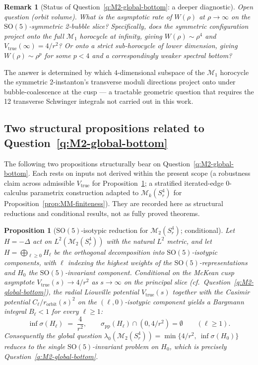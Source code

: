\documentclass[11pt,letterpaper]{article}
\newtheorem{proposition}[theorem]{Proposition}
\theoremstyle{definition}
\newtheorem{remark}[theorem]{Remark}
\newcommand{\cM}{\mathcal{M}}
\newcommand{\Lap}{\Delta}
\begin{document}
\begin{remark}[Status of Question~\ref{q:M2-global-bottom}: a deeper diagnostic]
\smallskip
\noindent\textit{Open question (orbit volume).} \emph{What is the asymptotic rate of $W(\rho)$ at $\rho \to \infty$ on the $\mathrm{SO}(5)$-symmetric 2-bubble slice? Specifically, does the symmetric configuration project onto the full $\cM_1$ horocycle at infinity, giving $W(\rho) \sim \rho^4$ and $V_{\mathrm{true}}(\infty) = 4/r^2$? Or onto a strict sub-horocycle of lower dimension, giving $W(\rho) \sim \rho^p$ for some $p < 4$ and a correspondingly weaker spectral bottom?}

\smallskip
\noindent The answer is determined by which $4$-dimensional subspace of the $\cM_1$ horocycle the symmetric 2-instanton's transverse moduli directions project onto under bubble-coalescence at the cusp — a tractable geometric question that requires the 12 transverse Schwinger integrals not carried out in this work.
\end{remark}

\subsection{Two structural propositions related to Question~\ref{q:M2-global-bottom}}\label{sec:structural-props}

The following two propositions structurally bear on Question~\ref{q:M2-global-bottom}. Each rests on inputs not derived within the present scope (a robustness claim across admissible $V_{\mathrm{true}}$ for Proposition~\ref{prop:SO5-isotypic}; a stratified iterated-edge $0$-calculus parametrix construction adapted to $\cM_k(S^4_r)$ for Proposition~\ref{prop:MM-finiteness}). They are recorded here as structural reductions and conditional results, not as fully proved theorems.

\begin{proposition}[$\mathrm{SO}(5)$-isotypic reduction for $\cM_2(S^4_r)$; conditional]\label{prop:SO5-isotypic}
Let $H = -\Lap$ act on $L^2(\cM_2(S^4_r))$ with the natural $L^2$ metric, and let $H = \bigoplus_{\ell\ge 0} H_\ell$ be the orthogonal decomposition into $\mathrm{SO}(5)$-isotypic components, with $\ell$ indexing the highest weights of the $\mathrm{SO}(5)$-representations and $H_0$ the $\mathrm{SO}(5)$-invariant component. Conditional on the McKean cusp asymptote $V_{\mathrm{true}}(s) \to 4/r^2$ as $s \to \infty$ on the principal slice (cf.\ Question~\ref{q:M2-global-bottom}), the radial Liouville potential $V_{\mathrm{true}}(s)$ together with the Casimir potential $C_\ell/r_{\mathrm{orbit}}(s)^2$ on the $(\ell,0)$-isotypic component yields a Bargmann integral $B_\ell < 1$ for every $\ell \ge 1$:
\[
\inf\sigma(H_\ell) \;=\; \frac{4}{r^2},\qquad \sigma_{\mathrm{pp}}(H_\ell)\cap (0, 4/r^2) = \emptyset \qquad (\ell \ge 1).
\]
Consequently the global question $\lambda_0(\cM_2(S^4_r)) = \min\{4/r^2,\ \inf\sigma(H_0)\}$ reduces to the single $\mathrm{SO}(5)$-invariant problem on $H_0$, which is precisely Question~\ref{q:M2-global-bottom}.
\end{proposition}
\end{document}
